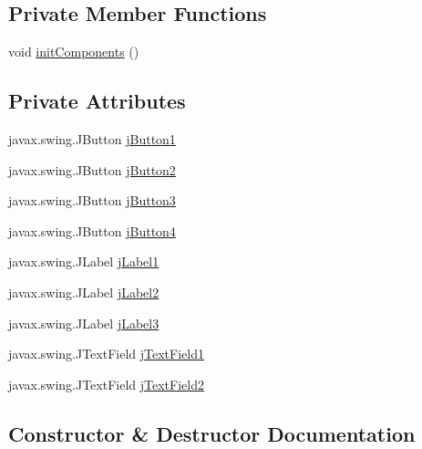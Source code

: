 \subsection*{Private Member Functions}
\begin{DoxyCompactItemize}
\item 
void \mbox{\hyperlink{classpa__sesion6_1_1_prog_principal_a6c2bc36ec75138743c72ca080398711a}{init\+Components}} ()
\end{DoxyCompactItemize}
\subsection*{Private Attributes}
\begin{DoxyCompactItemize}
\item 
javax.\+swing.\+J\+Button \mbox{\hyperlink{classpa__sesion6_1_1_prog_principal_ac3fa4d920e564a95291a07710b145455}{j\+Button1}}
\item 
javax.\+swing.\+J\+Button \mbox{\hyperlink{classpa__sesion6_1_1_prog_principal_a124fb4257898d5e460eed588be9d285c}{j\+Button2}}
\item 
javax.\+swing.\+J\+Button \mbox{\hyperlink{classpa__sesion6_1_1_prog_principal_ab47a77238e53b4e0e6d1d5cd5d83620d}{j\+Button3}}
\item 
javax.\+swing.\+J\+Button \mbox{\hyperlink{classpa__sesion6_1_1_prog_principal_a9703d219be4d93bd1f6ed81cbfc1af61}{j\+Button4}}
\item 
javax.\+swing.\+J\+Label \mbox{\hyperlink{classpa__sesion6_1_1_prog_principal_a52f639c7e833b4a261a9de20d1bb8e80}{j\+Label1}}
\item 
javax.\+swing.\+J\+Label \mbox{\hyperlink{classpa__sesion6_1_1_prog_principal_a43bcbbe1661eb5a6c1cbc52e7f15ef96}{j\+Label2}}
\item 
javax.\+swing.\+J\+Label \mbox{\hyperlink{classpa__sesion6_1_1_prog_principal_a4531dd28f71269d0ecd682e0c8f6cc2e}{j\+Label3}}
\item 
javax.\+swing.\+J\+Text\+Field \mbox{\hyperlink{classpa__sesion6_1_1_prog_principal_a1b336bc5700d2300c7c85f594b2a67c5}{j\+Text\+Field1}}
\item 
javax.\+swing.\+J\+Text\+Field \mbox{\hyperlink{classpa__sesion6_1_1_prog_principal_a0381b47538147a043d91431e3cb981dc}{j\+Text\+Field2}}
\end{DoxyCompactItemize}


\subsection{Constructor \& Destructor Documentation}
\mbox{\label{classpa__sesion6_1_1_prog_principal_a9df4d17bd1c700512b0f59e19c45edac}} 
